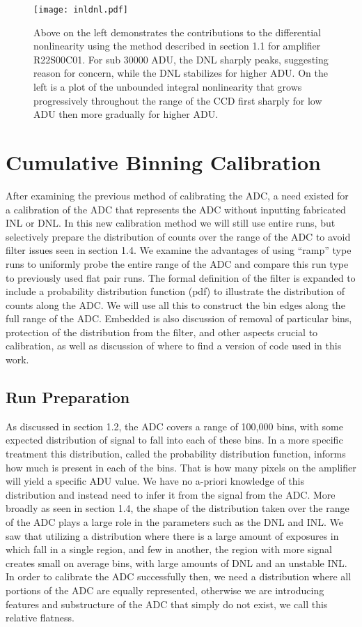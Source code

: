 \documentclass[11pt, letterpaper]{article}
\begin{document}
\begin{figure}
	\texttt{[image: inldnl.pdf]}
	\caption{Above on the left demonstrates the contributions to the differential nonlinearity using the method described in section 1.1 for amplifier R22S00C01. For sub 30000 ADU, the DNL sharply peaks, suggesting reason for concern, while the DNL stabilizes for higher ADU. On the left is a plot of the unbounded integral nonlinearity that grows progressively throughout the range of the CCD first sharply for low ADU then more gradually for higher ADU.}
\end{figure}

\section{Cumulative Binning Calibration}
\indent


After examining the previous method of calibrating the ADC, a need existed for a calibration of the ADC that represents the ADC without inputting fabricated INL or DNL. 
In this new calibration method we will still use entire runs, but selectively prepare the distribution of counts over the range of the ADC to avoid filter issues seen in section 1.4.
We examine the advantages of using “ramp” type runs to uniformly probe the entire range of the ADC and compare this run type to previously used flat pair runs.
The formal definition of the filter is expanded to include a probability distribution function (pdf) to illustrate the distribution of counts along the ADC. 
We will use all this to construct the bin edges along the full range of the ADC. 
Embedded is also discussion of removal of particular bins, protection of the distribution from the filter, and other aspects crucial to calibration, as well as discussion of where to find a version of code used in this work.

\subsection{Run Preparation}
\indent


As discussed in section 1.2, the ADC covers a range of 100,000 bins, with some expected distribution of signal to fall into each of these bins. 
In a more specific treatment this distribution, called the probability distribution function, informs how much is present in each of the bins.
That is how many pixels on the amplifier will yield a specific ADU value.
We have no a-priori knowledge of this distribution and instead need to infer it from the signal from the ADC.
More broadly as seen in section 1.4, the shape of the distribution taken over the range of the ADC plays a large role in the parameters such as the DNL and INL.
We saw that utilizing a distribution where there is a large amount of exposures in which fall in a single region, and few in another, the region with more signal creates small on average bins, with large amounts of DNL and an unstable INL. 
In order to calibrate the ADC successfully then, we need a distribution where all portions of the ADC are equally represented, otherwise we are introducing features and substructure of the ADC that simply do not exist, we call this relative flatness. 
\indent 
\end{document}
